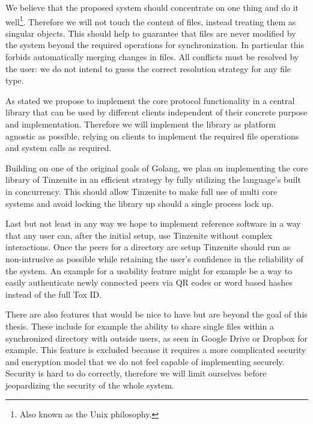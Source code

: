 \begin{description}[leftmargin=2em,style=nextline,noitemsep,nolistsep]
\item[Object Atomicity]
    We believe that the proposed system should concentrate on one thing and do it well\footnote{Also known as the Unix philosophy.}.
    Therefore we will not touch the content of files, instead treating them as singular objects.
    This should help to guarantee that files are never modified by the system beyond the required operations for synchronization.
    In particular this forbids automatically merging changes in files.
    All conflicts must be resolved by the user: we do not intend to guess the correct resolution strategy for any file type.
\item[Client Agnostic]
    As stated we propose to implement the core protocol functionality in a central library that can be used by different clients independent of their concrete purpose and implementation.
    Therefore we will implement the library as platform agnostic as possible, relying on clients to implement the required file operations and system calls as required.
\item[Concurrency]
    Building on one of the original goals of Golang, we plan on implementing the core library of Tinzenite in an efficient strategy by fully utilizing the language's built in concurrency.
    This should allow Tinzenite to make full use of multi core systems and avoid locking the library up should a single process lock up.
\item[Usability]
    Last but not least in any way we hope to implement reference software in a way that any user can, after the initial setup, use Tinzenite without complex interactions.
    Once the peers for a directory are setup Tinzenite should run as non-intrusive as possible while retaining the user's confidence in the reliability of the system.
    An example for a usability feature might for example be a way to easily authenticate newly connected peers via QR codes or word based hashes instead of the full Tox ID.
\end{description}

There are also features that would be nice to have but are beyond the goal of this thesis.
These include for example the ability to share single files within a synchronized directory with outside users, as seen in Google Drive or Dropbox for example.
This feature is excluded because it requires a more complicated security and encryption model that we do not feel capable of implementing securely.
Security is hard to do correctly, therefore we will limit ourselves before jeopardizing the security of the whole system.

